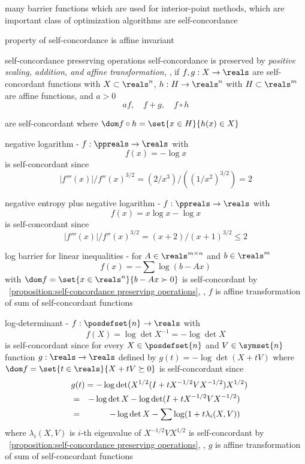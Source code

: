 \documentclass[17pt,landscape]{foils}
\begin{document}
{	\vitem
		many barrier functions which are used for interior-point methods,
		which are important class of optimization algorithms
		are self-concordance

	\vitem
		property of self-concordance is affine invariant

	\eit
\eit



\begin{myproposition}{self-concordance preserving operations}
	self-concordance is preserved by \emph{positive scaling, addition, and affine transformation,}
	\ie,
	if $f, g:X\to\reals$ are self-concordant functions with $X\subset\reals^n$,
	$h:H\to\reals^n$ with $H\subset \reals^m$ are affine functions,
	and $a>0$\
	$$
		af,
		\quad
		f+g,
		\quad
		f\circ h
	$$

	are self-concordant
	where
	$\dom f\circ h = \set{x\in H}{h(x) \in X}$

\end{myproposition}



\bit
\item
	negative logarithm
	-
	$f:\ppreals \to \reals$ with
	$$
		f(x)=-\log x
	$$
	is self-concordant since
	$$
		|f'''(x)| / f''(x)^{3/2} = \left(2/x^3\right) / \left((1/x^2)^{3/2}\right) = 2
	$$

\vitem
	negative entropy plus negative logarithm
	-
	$f:\ppreals \to \reals$ with $$f(x)=x\log x-\log x$$
	is self-concordant since
	$$
		|f'''(x)| / f''(x)^{3/2} = (x+2)/{(x+1)^{3/2}}
		\leq 2
	$$

\vitem
	log barrier for linear inequalities
	-
	for $A\in\reals^{m\times n}$ and $b\in\reals^m$
	$$
		f(x) = - \sum \log(b-Ax)
	$$
	with $\dom f = \set{x\in\reals^n}{b-Ax \succ 0}$
	is self-concordant
	by
	\propositionname~\ref{proposition:self-concordance preserving operations},
	\ie, $f$ is affine transformation of sum of self-concordant functions

\vitem
	log-determinant
	-
	$f:\posdefset{n}\to\reals$
	with
	$$
		f(X) = \log\det X^{-1} = - \log\det X
	$$
	is self-concordant since
	for every $X\in \posdefset{n}$ and $V\in\symset{n}$
	function $g:\reals\to\reals$ defined by $g(t) = - \log\det(X+tV)$
	where $\dom f = \set{t\in\reals}{X+tV\succeq 0}$
	is self-concordant
	since
	\begin{eqnarray*}
		\lefteqn{
			g(t) = - \log \det (X^{1/2} (I + tX^{-1/2} V X^{-1/2})X^{1/2})
		}
		\\
		&=&
			-\log\det X - \log\det(I+tX^{-1/2}VX^{-1/2})
		\\
		&=&
			-\log\det X - \sum \log (1+t\lambda_i(X,V))
	\end{eqnarray*}
	where
	$\lambda_i(X,V)$ is $i$-th eigenvalue of $X^{-1/2}VX^{1/2}$
	is self-concordant
	by
	\propositionname~\ref{proposition:self-concordance preserving operations},
	\ie, $g$ is affine transformation of sum of self-concordant functions

}
\end{document}
